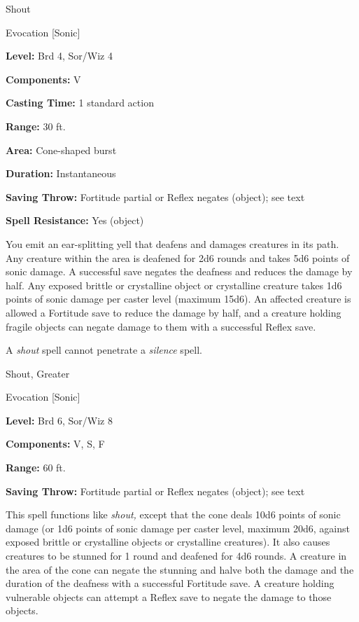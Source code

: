 \documentclass{article}
\begin{document}
\vspace{12pt}
Shout

Evocation [Sonic]

\textbf{Level:} Brd 4, Sor/Wiz 4

\textbf{Components:} V

\textbf{Casting Time:} 1 standard action

\textbf{Range:} 30 ft.

\textbf{Area:} Cone-shaped burst

\textbf{Duration:} Instantaneous

\textbf{Saving Throw:} Fortitude partial or Reflex negates (object); see text

\textbf{Spell Resistance:} Yes (object)

You emit an ear-splitting yell that deafens and damages creatures in its path. 
Any creature within the area is deafened for 2d6 rounds and takes 5d6 points of 
sonic damage. A successful save negates the deafness and reduces the damage by 
half. Any exposed brittle or crystalline object or crystalline creature takes 1d6 
points of sonic damage per caster level (maximum 15d6). An affected creature is 
allowed a Fortitude save to reduce the damage by half, and a creature holding fragile 
objects can negate damage to them with a successful Reflex save.

A \textit{shout }spell cannot penetrate a \textit{silence }spell.

\vspace{12pt}
Shout, Greater

Evocation [Sonic]

\textbf{Level:} Brd 6, Sor/Wiz 8

\textbf{Components:} V, S, F

\textbf{Range:} 60 ft.

\textbf{Saving Throw:} Fortitude partial or Reflex negates (object); see text

This spell functions like \textit{shout, }except that the cone deals 10d6 points 
of sonic damage (or 1d6 points of sonic damage per caster level, maximum 20d6, 
against exposed brittle or crystalline objects or crystalline creatures). It also 
causes creatures to be stunned for 1 round and deafened for 4d6 rounds. A creature 
in the area of the cone can negate the stunning and halve both the damage and the 
duration of the deafness with a successful Fortitude save. A creature holding vulnerable 
objects can attempt a Reflex save to negate the damage to those objects.
\end{document}
